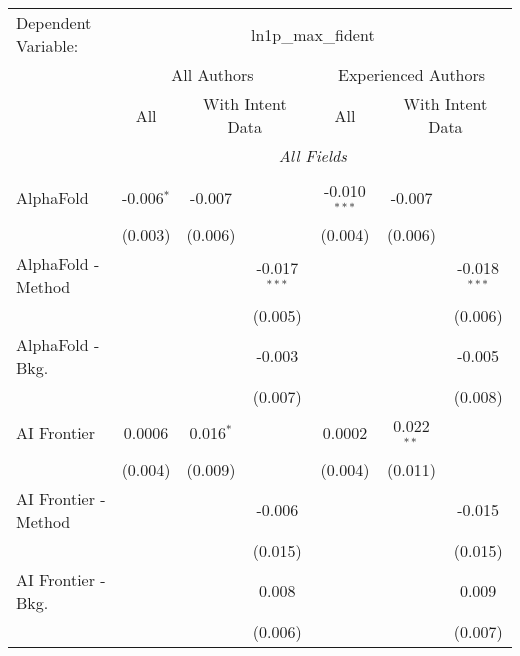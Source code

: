 \begingroup
\centering
\begin{tabular}{lcccccc}
   \tabularnewline \midrule \midrule
   Dependent Variable: & \multicolumn{6}{c}{ln1p\_max\_fident}\\
 & \multicolumn{3}{c}{All Authors} & \multicolumn{3}{c}{Experienced Authors} \\
\cmidrule(lr){2-4} \cmidrule(lr){5-7}
 & \multicolumn{1}{c}{All} & \multicolumn{2}{c}{With Intent Data} & \multicolumn{1}{c}{All} & \multicolumn{2}{c}{With Intent Data} \\
\cmidrule(lr){2-2} \cmidrule(lr){3-4} \cmidrule(lr){5-5} \cmidrule(lr){6-7}
 & \multicolumn{6}{c}{\textit{All Fields}} \\ \\
   AlphaFold            & -0.006$^{*}$ & -0.007      &                & -0.010$^{***}$ & -0.007       &   \\   
                        & (0.003)      & (0.006)     &                & (0.004)        & (0.006)      &   \\   
   AlphaFold - Method   &              &             & -0.017$^{***}$ &                &              & -0.018$^{***}$\\   
                        &              &             & (0.005)        &                &              & (0.006)\\   
   AlphaFold - Bkg.     &              &             & -0.003         &                &              & -0.005\\   
                        &              &             & (0.007)        &                &              & (0.008)\\   
   AI Frontier          & 0.0006       & 0.016$^{*}$ &                & 0.0002         & 0.022$^{**}$ &   \\   
                        & (0.004)      & (0.009)     &                & (0.004)        & (0.011)      &   \\   
   AI Frontier - Method &              &             & -0.006         &                &              & -0.015\\   
                        &              &             & (0.015)        &                &              & (0.015)\\   
   AI Frontier - Bkg.   &              &             & 0.008          &                &              & 0.009\\   
                        &              &             & (0.006)        &                &              & (0.007)\\   

\end{tabular}
